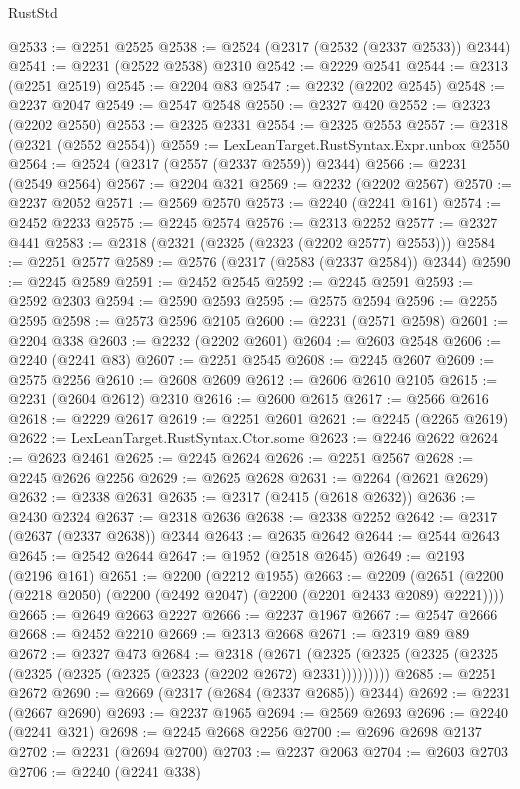 \begin{lexlean}{RustStd}
\begin{coremodule}
@2533 := @2251 @2525
@2538 := @2524 (@2317 (@2532 (@2337 @2533)) @2344)
@2541 := @2231 (@2522 @2538) @2310
@2542 := @2229 @2541
@2544 := @2313 (@2251 @2519)
@2545 := @2204 @83
@2547 := @2232 (@2202 @2545)
@2548 := @2237 @2047
@2549 := @2547 @2548
@2550 := @2327 @420
@2552 := @2323 (@2202 @2550)
@2553 := @2325 @2331
@2554 := @2325 @2553
@2557 := @2318 (@2321 (@2552 @2554))
@2559 := LexLeanTarget.RustSyntax.Expr.unbox @2550
@2564 := @2524 (@2317 (@2557 (@2337 @2559)) @2344)
@2566 := @2231 (@2549 @2564)
@2567 := @2204 @321
@2569 := @2232 (@2202 @2567)
@2570 := @2237 @2052
@2571 := @2569 @2570
@2573 := @2240 (@2241 @161)
@2574 := @2452 @2233
@2575 := @2245 @2574
@2576 := @2313 @2252
@2577 := @2327 @441
@2583 := @2318 (@2321 (@2325 (@2323 (@2202 @2577) @2553)))
@2584 := @2251 @2577
@2589 := @2576 (@2317 (@2583 (@2337 @2584)) @2344)
@2590 := @2245 @2589
@2591 := @2452 @2545
@2592 := @2245 @2591
@2593 := @2592 @2303
@2594 := @2590 @2593
@2595 := @2575 @2594
@2596 := @2255 @2595
@2598 := @2573 @2596 @2105
@2600 := @2231 (@2571 @2598)
@2601 := @2204 @338
@2603 := @2232 (@2202 @2601)
@2604 := @2603 @2548
@2606 := @2240 (@2241 @83)
@2607 := @2251 @2545
@2608 := @2245 @2607
@2609 := @2575 @2256
@2610 := @2608 @2609
@2612 := @2606 @2610 @2105
@2615 := @2231 (@2604 @2612) @2310
@2616 := @2600 @2615
@2617 := @2566 @2616
@2618 := @2229 @2617
@2619 := @2251 @2601
@2621 := @2245 (@2265 @2619)
@2622 := LexLeanTarget.RustSyntax.Ctor.some
@2623 := @2246 @2622
@2624 := @2623 @2461
@2625 := @2245 @2624
@2626 := @2251 @2567
@2628 := @2245 @2626 @2256
@2629 := @2625 @2628
@2631 := @2264 (@2621 @2629)
@2632 := @2338 @2631
@2635 := @2317 (@2415 (@2618 @2632))
@2636 := @2430 @2324
@2637 := @2318 @2636
@2638 := @2338 @2252
@2642 := @2317 (@2637 (@2337 @2638)) @2344
@2643 := @2635 @2642
@2644 := @2544 @2643
@2645 := @2542 @2644
@2647 := @1952 (@2518 @2645)
@2649 := @2193 (@2196 @161)
@2651 := @2200 (@2212 @1955)
@2663 := @2209 (@2651 (@2200 (@2218 @2050) (@2200 (@2492 @2047) (@2200 (@2201 @2433 @2089) @2221))))
@2665 := @2649 @2663 @2227
@2666 := @2237 @1967
@2667 := @2547 @2666
@2668 := @2452 @2210
@2669 := @2313 @2668
@2671 := @2319 @89 @89
@2672 := @2327 @473
@2684 := @2318
    (@2671 (@2325 (@2325 (@2325 (@2325 (@2325 (@2325 (@2325 (@2323 (@2202 @2672) @2331)))))))))
@2685 := @2251 @2672
@2690 := @2669 (@2317 (@2684 (@2337 @2685)) @2344)
@2692 := @2231 (@2667 @2690)
@2693 := @2237 @1965
@2694 := @2569 @2693
@2696 := @2240 (@2241 @321)
@2698 := @2245 @2668 @2256
@2700 := @2696 @2698 @2137
@2702 := @2231 (@2694 @2700)
@2703 := @2237 @2063
@2704 := @2603 @2703
@2706 := @2240 (@2241 @338)

\end{coremodule}
\end{lexlean}
